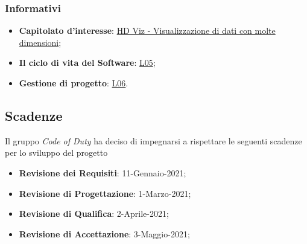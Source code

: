 	\subsubsection{Informativi}
		\begin{itemize}
			\item \textbf{Capitolato d'interesse}: \href{https://www.math.unipd.it/~tullio/IS-1/2020/Progetto/C4.pdf}{HD Viz - Visualizzazione di dati con molte dimensioni};
			\item \textbf{Il ciclo di vita del Software}: \href{https://www.math.unipd.it/~tullio/IS-1/2020/Dispense/L05.pdf}{L05};
			\item \textbf{Gestione di progetto}: \href{https://www.math.unipd.it/~tullio/IS-1/2020/Dispense/L06.pdf}{L06}.
		\end{itemize}
\subsection{Scadenze}
	Il gruppo \textit{Code of Duty} ha deciso di impegnarsi a rispettare le seguenti scadenze per lo sviluppo del progetto \hd
	\begin{itemize}
		\item \textbf{Revisione dei Requisiti}: 11-Gennaio-2021;
		\item \textbf{Revisione di Progettazione}: 1-Marzo-2021;
		\item \textbf{Revisione di Qualifica}: 2-Aprile-2021;
		\item \textbf{Revisione di Accettazione}: 3-Maggio-2021;
	\end{itemize}
